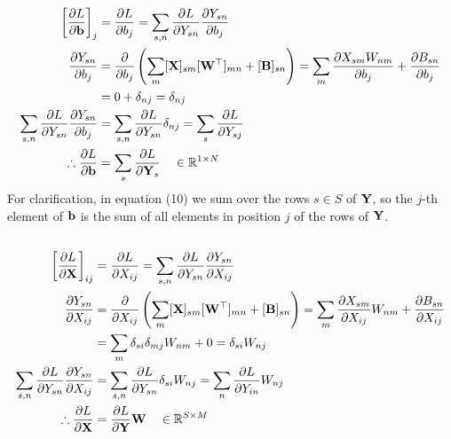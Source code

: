 \documentclass[a4paper]{article}
\begin{document}
\subsection{} %
\begin{align}
   \left[ \frac{\partial L}{\partial \mathbf{b}} \right]_{j} &= \frac{\partial L}{\partial b_{j}} = \sum_{s,n} \frac{\partial L}{\partial Y_{sn}} \frac{\partial Y_{sn}}{\partial b_{j}} \\
   \frac{\partial Y_{sn}}{\partial b_{j}} &= \frac{\partial}{\partial b_{j}} \left( \sum_{m} [\mathbf{X}]_{sm} [\mathbf{W}^\top]_{mn} + [\mathbf{B}]_{sn} \right) = \sum_m \frac{\partial X_{sm} W_{nm}}{\partial b_{j}} + \frac{\partial B_{sn}}{\partial b_{j}} \\
   &= 0 + \delta_{nj} = \delta_{nj} \\
   \sum_{s,n} \frac{\partial L}{\partial Y_{sn}} \frac{\partial Y_{sn}}{\partial b_{j}} &= \sum_{s,n} \frac{\partial L}{\partial Y_{sn}} \delta_{nj} = \sum_{s} \frac{\partial L}{\partial Y_{sj}} \\
   \therefore \frac{\partial L}{\partial \mathbf{b}} &= \sum_{s} \frac{\partial L}{\partial \mathbf{Y}_s} \quad \in \mathbb{R}^{1 \times N}
\end{align}
For clarification, in equation (10) we sum over the rows $s \in S$ of $\mathbf{Y}$, so the $j$-th element of $\mathbf{b}$ is the sum of all elements in position $j$ of the rows of $\mathbf{Y}$.
\bigskip

\subsection{} %
\begin{align}
   \left[ \frac{\partial L}{\partial \mathbf{X}} \right]_{ij} &= \frac{\partial L}{\partial X_{ij}} = \sum_{s,n} \frac{\partial L}{\partial Y_{sn}} \frac{\partial Y_{sn}}{\partial X_{ij}} \\
   \frac{\partial Y_{sn}}{\partial X_{ij}} &= \frac{\partial}{\partial X_{ij}} \left( \sum_{m} [\mathbf{X}]_{sm} [\mathbf{W}^\top]_{mn} + [\mathbf{B}]_{sn} \right) = \sum_m \frac{\partial X_{sm}}{\partial X_{ij}} W_{nm} + \frac{\partial B_{sn}}{\partial X_{ij}} \\
   &= \sum_m \delta_{si} \delta_{mj} W_{nm} + 0 = \delta_{si} W_{nj} \\
   \sum_{s,n} \frac{\partial L}{\partial Y_{sn}} \frac{\partial Y_{sn}}{\partial X_{ij}} &= \sum_{s,n} \frac{\partial L}{\partial Y_{sn}} \delta_{si} W_{nj} = \sum_{n} \frac{\partial L}{\partial Y_{in}} W_{nj} \\
   \therefore \frac{\partial L}{\partial \mathbf{X}} &= \frac{\partial L}{\partial \mathbf{Y}} \mathbf{W} \quad \in \mathbb{R}^{S \times M}
\end{align}
\bigskip
\end{document}
